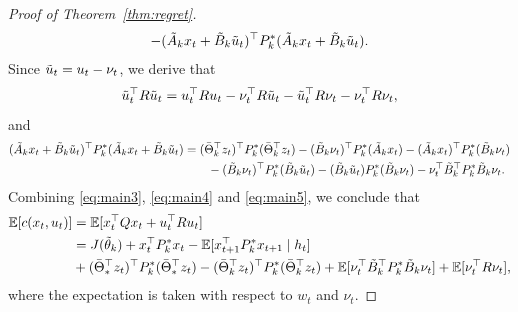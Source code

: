 \documentclass[11pt]{article}
\theoremstyle{plain}
\theoremstyle{definition}
\theoremstyle{remark}
\begin{document}
\begin{proof}[Proof of Theorem~\ref{thm:regret}]
\begin{equation}
\begin{split}
- (\tilde{A}_kx_t+\Tilde{B}_k\Tilde{u}_t )^\top P^*_k (\tilde{A}_kx_t+\Tilde{B}_k\Tilde{u}_t). 
\end{split}
\end{equation}
Since $\Tilde{u}_t = u_t - \nu_t$, we derive that
\begin{equation}\label{eq:main4}
    \Tilde{u}_t^{\top}R\Tilde{u}_t =u_t^{\top}Ru_t -\nu_t^{\top} R \Tilde{u}_t-\Tilde{u}_t^{\top}R\nu_t - \nu_t^{\top} R \nu_t,
\end{equation}
and
\begin{equation}\label{eq:main5}
\begin{split}
  (\tilde{A}_kx_t+\Tilde{B}_k\Tilde{u}_t )^\top P^*_k (\tilde{A}_kx_t+\Tilde{B}_k\Tilde{u}_t) &= (\bar{\Theta}_k^\top z_t )^\top P^*_k (\bar{\Theta}_k^\top z_t )-(\Tilde{B}_k\nu_t)^{\top}P^*_k(\Tilde{A}_kx_t)-(\Tilde{A}_kx_t)^{\top}P^*_k(\Tilde{B}_k\nu_t)\\
    &\quad\quad-(\Tilde{B}_k\nu_t)^{\top}P^*_k(\Tilde{B}_k\tilde{u}_t)-(\Tilde{B}_k\tilde{u}_t)P^*_k(\Tilde{B}_k\nu_t)- \nu_t^{\top} \Tilde{B}_k^{\top}P^*_k\Tilde{B}_k\nu_t.
\end{split}    
\end{equation}
Combining \eqref{eq:main3}, \eqref{eq:main4} and \eqref{eq:main5}, we conclude that 
\begin{equation*}
\begin{split}
\mathbb{E}[c (x_t, u_t)] &= \mathbb{E}[x_t^{\top} Q x_t + u_t^{\top} R u_t] \\
&= J(\tilde{\theta}_k) + x_t^\top P^*_k x_t 
-\mathbb{E} [ x_{t+1}^\top P^*_k x_{t+1} \mid h_t]\\
&+ (\bar{\Theta}_*^\top z_t )^\top P^*_k (\bar{\Theta}_*^\top z_t )
- (\bar{\Theta}_k^\top z_t )^\top P^*_k (\bar{\Theta}_k^\top z_t ) + \mathbb{E}[\nu_t^{\top} \Tilde{B}_k^{\top}P^*_k\Tilde{B}_k\nu_t] +\mathbb{E}[\nu_t^{\top} R \nu_t],
\end{split}
\end{equation*}
where the expectation is taken with respect to $w_t$ and $\nu_t$.


\end{proof}
\end{document}
